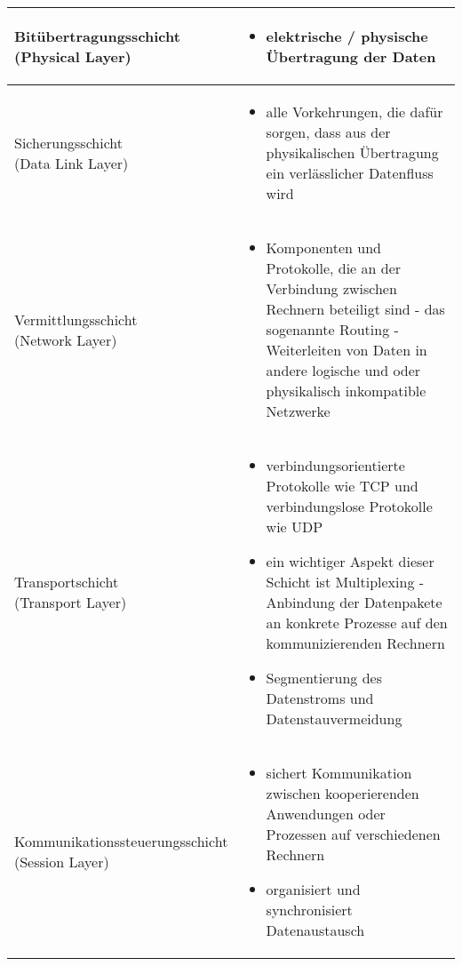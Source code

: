 \renewcommand{\tabcolsep}{1pt}
\begin{longtable}{@{}p{}@{\hspace{3em}}p{}}
    \hline
    \makecell[l]{Bitübertragungsschicht \\ (Physical Layer)}
        & 
        \begin{itemize}
            \item elektrische / physische Übertragung der Daten 
        \end{itemize}
        
    \\\hline

    \makecell[l]{Sicherungsschicht \\ (Data Link Layer)}
        &
        \begin{itemize}
            \item alle Vorkehrungen, die dafür sorgen, dass aus der physikalischen Übertragung ein verlässlicher Datenfluss wird
        
        \end{itemize}
    \\\hline
    
    \makecell[l]{Vermittlungsschicht \\ (Network Layer)}
        &
        \begin{itemize}
            \item Komponenten und Protokolle, die an der Verbindung zwischen Rechnern beteiligt sind - das sogenannte Routing - Weiterleiten von Daten in andere logische und oder physikalisch inkompatible Netzwerke
        \end{itemize}
    \\\hline
    
    \makecell[l]{Transportschicht \\ (Transport Layer)}
        &
        \begin{itemize}
            \item verbindungsorientierte Protokolle wie TCP und verbindungslose Protokolle wie UDP
            \item ein wichtiger Aspekt dieser Schicht ist Multiplexing - Anbindung der Datenpakete an konkrete Prozesse auf den kommunizierenden Rechnern 
            \item Segmentierung des Datenstroms und Datenstauvermeidung
        \end{itemize}
    \\\hline

    \makecell[l]{Kommunikationssteuerungsschicht \\ (Session Layer)}
        &
        \begin{itemize}
            \item sichert Kommunikation zwischen kooperierenden Anwendungen oder Prozessen auf verschiedenen Rechnern
            \item organisiert und synchronisiert Datenaustausch
        \end{itemize}
    \\\hline


\end{longtable}
